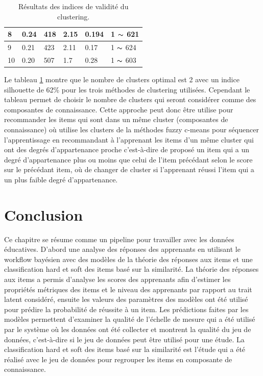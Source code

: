 \begin{table}[H]
\begin{tabular}{|m{2cm}|m{2cm}|m{2cm}|m{2cm}|m{2cm}|m{3cm}|}
	8  & 0.24  & 418  & 2.15   &  0.194    &  1   \(\displaystyle \thicksim  \)  621 \\ \hline
	9  & 0.21  & 423  & 2.11   &  0.17     &  1   \(\displaystyle \thicksim  \)  624 \\ \hline
	10 & 0.20  & 507  & 1.7    &  0.28     &  1   \(\displaystyle \thicksim  \)  603 \\ \hline
  \end{tabular}
	\caption{Résultats des indices de validité du clustering.}
	\label{clusters_indice_score}
\end{table}

Le tableau \ref{clusters_indice_score} montre que le nombre de clusters optimal est 2 avec un indice silhouette de 62\% pour les trois méthodes de clustering utilisées. Cependant le tableau permet de choisir le nombre de clusters qui seront considérer comme des composantes de connaissance. Cette approche peut donc être utilise pour recommander les items qui sont dans un même cluster (composantes de connaissance) où utilise les clusters de la méthodes fuzzy c-means pour séquencer l’apprentissage en recommandant à l’apprenant les items d’un même cluster qui ont des degrés d’appartenance proche c’est-à-dire de proposé un item qui a un degré d’appartenance plus ou moins que celui de l’item précédant selon le score sur le précédant item, où de changer de cluster si l’apprenant réussi l’item qui a un plus faible degré d’appartenance.

\section{Conclusion}
Ce chapitre se résume comme un pipeline pour travailler avec les données éducatives. D’abord une analyse des réponses des apprenants en utilisant le workflow bayésien avec des modèles de la théorie des réponses aux items et une classification hard et soft des items basé sur la similarité. La théorie des réponses aux items a permis d’analyse les scores des apprenants afin d’estimer les propriétés métriques
des items et le niveau des apprenants par rapport au trait latent considéré, ensuite les valeurs des paramètres des modèles ont été utilisé pour prédire la probabilité de réussite à un item. Les prédictions faites par les modèles permettent d’examiner la qualité de l’échelle de mesure qui a été utilisé par le système où les données ont été collecter et montrent la qualité du jeu de données, c’est-à-dire si le jeu de données peut être utilisé pour une étude. La classification hard et soft des items basé sur la similarité est l’étude qui a été réalisé avec le jeu de données pour regrouper les items en composante de connaissance.

 